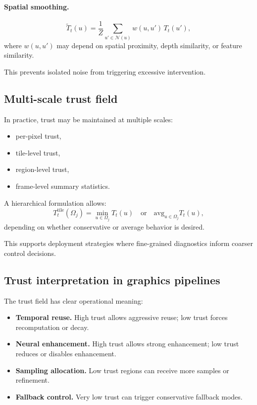 \documentclass[11pt]{article}
\theoremstyle{definition}
\theoremstyle{plain}
\begin{document}
\paragraph{Spatial smoothing.}
\begin{equation}
\tilde T_t(u)=
\frac{1}{Z}\sum_{u'\in\mathcal{N}(u)} w(u,u')\,T_t(u'),
\end{equation}
where $w(u,u')$ may depend on spatial proximity, depth similarity, or feature similarity.

This prevents isolated noise from triggering excessive intervention.


\subsection{Multi-scale trust field}

In practice, trust may be maintained at multiple scales:
\begin{itemize}[leftmargin=1.5em]
    \item per-pixel trust,
    \item tile-level trust,
    \item region-level trust,
    \item frame-level summary statistics.
\end{itemize}

A hierarchical formulation allows:
\begin{equation}
T^{\mathrm{tile}}_t(\Omega_j)=\min_{u\in\Omega_j} T_t(u)
\quad \text{or} \quad
\mathrm{avg}_{u\in\Omega_j} T_t(u),
\end{equation}
depending on whether conservative or average behavior is desired.

This supports deployment strategies where fine-grained diagnostics inform coarser control decisions.


\subsection{Trust interpretation in graphics pipelines}

The trust field has clear operational meaning:

\begin{itemize}[leftmargin=1.5em]
    \item \textbf{Temporal reuse.} High trust allows aggressive reuse; low trust forces recomputation or decay.
    \item \textbf{Neural enhancement.} High trust allows strong enhancement; low trust reduces or disables enhancement.
    \item \textbf{Sampling allocation.} Low trust regions can receive more samples or refinement.
    \item \textbf{Fallback control.} Very low trust can trigger conservative fallback modes.
\end{itemize}
\end{document}
